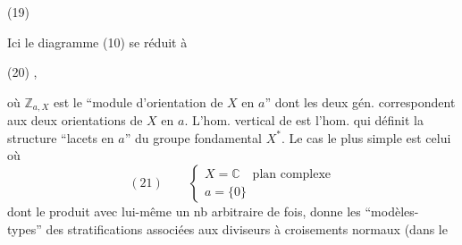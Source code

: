 \noindent (19)

Ici le diagramme (10) se réduit à

\noindent (20)
,

où $\mathbb Z_{a,X}$ est le ``module d'orientation de
$X$ en $a$'' dont les deux gén. correspondent
aux deux orientations de $X$ en $a$. L'hom.
vertical de  est l'hom. qui définit
la structure ``lacets en $a$'' du groupe
fondamental $X^*$. Le cas le plus
simple est celui où
\[
(21)\qquad\left\{\begin{array}{l}
X=\mathbb C\quad\text{plan complexe}\\
a=\{0\}
\end{array}\right.
\]
dont le produit avec lui-même un nb
arbitraire de fois, donne les ``modèles-
types'' des stratifications associées aux
diviseurs à croisements normaux (dans le
